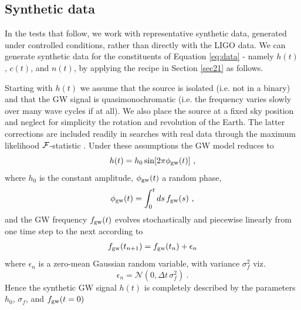 \documentclass[pra,superscriptaddress,reprint,amsmath,amssymb,nofootinbib]{revtex4-2}
\begin{document}
\subsection{Synthetic data} \label{sec:creating_data}
In the tests that follow, we work with representative synthetic data, generated under controlled conditions, rather than directly with the LIGO data. We can generate synthetic data for the constituents of Equation \eqref{eq:data} - namely $h(t)$, $c(t)$, and $n(t)$, by applying the recipe in Section \ref{sec21} as follows. \newline 

Starting with $h(t)$ we assume that the source is isolated (i.e. not in a binary) and that the GW signal is quasimonochromatic (i.e. the frequency varies slowly over many wave cycles if at all). We also place the source at a fixed sky position and neglect for simplicity the rotation and revolution of the Earth. The latter corrections are included readily in searches with real data through the maximum likelihood ${\cal F}$-statistic \citep{Jaranowski1998}. Under these assumptions the GW model reduces to 
\begin{equation}
	h(t) = h_0\sin[2\pi \phi_{\rm gw}(t)] \ , 
\end{equation}
where $h_0$ is the constant amplitude, $\phi_{\rm gw}(t)$ a random phase,
\begin{equation}
	\phi_{\rm gw}(t) = \int_{0}^{t} ds \, f_{\rm gw}(s)  \ ,
\end{equation}
and the GW frequency $f_{\rm gw}(t)$ evolves stochastically and piecewise linearly from one time step to the next according to
\begin{eqnarray}
	f_{\rm gw}(t_{n+1}) = f_{\rm gw}(t_n) + \epsilon_n 
\end{eqnarray}
where $\epsilon_n$ is a zero-mean Gaussian random variable, with variance $\sigma_f^2$ viz.
\begin{equation}
	\epsilon_n = \mathcal{N}(0, \Delta t  \, \sigma_f^2) \ . \label{eq:gwfreqnoise}
\end{equation}
Hence the synthetic GW signal $h(t)$ is completely described by the parameters $h_0$, $\sigma_f$, and $f_{\rm gw}(t=0)$ \newline 
\end{document}
